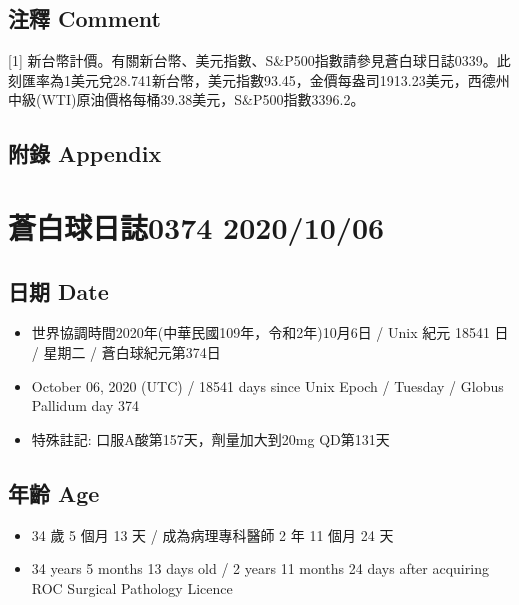 \documentclass[a5paper, 11pt
]{book}
\providecommand{\tightlist}{%
  \setlength{\itemsep}{0pt}\setlength{\parskip}{0pt}}
\begin{document}
\hypertarget{ux6ce8ux91cb-comment-32}{%
\subsection{注釋 Comment}\label{ux6ce8ux91cb-comment-32}}

{[}1{]}
新台幣計價。有關新台幣、美元指數、S\&P500指數請參見蒼白球日誌0339。此刻匯率為1美元兌28.741新台幣，美元指數93.45，金價每盎司1913.23美元，西德州中級(WTI)原油價格每桶39.38美元，S\&P500指數3396.2。

\hypertarget{ux9644ux9304-appendix-32}{%
\subsection{附錄 Appendix}\label{ux9644ux9304-appendix-32}}

\hypertarget{ux84bcux767dux7403ux65e5ux8a8c0374-20201006}{%
\section{蒼白球日誌0374
2020/10/06}\label{ux84bcux767dux7403ux65e5ux8a8c0374-20201006}}

\hypertarget{ux65e5ux671f-date-33}{%
\subsection{日期 Date}\label{ux65e5ux671f-date-33}}

\begin{itemize}
\tightlist
\item
  世界協調時間2020年(中華民國109年，令和2年)10月6日 / Unix 紀元 18541 日
  / 星期二 / 蒼白球紀元第374日
\item
  October 06, 2020 (UTC) / 18541 days since Unix Epoch / Tuesday /
  Globus Pallidum day 374
\item
  特殊註記: 口服A酸第157天，劑量加大到20mg QD第131天
\end{itemize}

\hypertarget{ux5e74ux9f61-age-33}{%
\subsection{年齡 Age}\label{ux5e74ux9f61-age-33}}

\begin{itemize}
\tightlist
\item
  34 歲 5 個月 13 天 / 成為病理專科醫師 2 年 11 個月 24 天
\item
  34 years 5 months 13 days old / 2 years 11 months 24 days after
  acquiring ROC Surgical Pathology Licence
\end{itemize}
\end{document}
